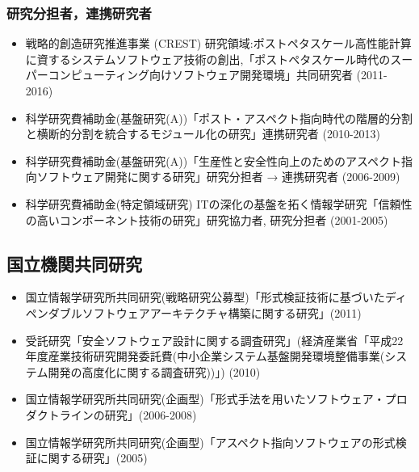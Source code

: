 \documentclass{jarticle}
\begin{document}
\subsubsection{研究分担者，連携研究者}

\begin{itemize}
\item 戦略的創造研究推進事業 (CREST) 研究領域:ポストペタスケール高性能計算に資するシステムソフトウェア技術の創出,「ポストペタスケール時代のスーパーコンピューティング向けソフトウェア開発環境」共同研究者 (2011-2016)

\item 科学研究費補助金(基盤研究(A))「ポスト・アスペクト指向時代の階層的分割と横断的分割を統合するモジュール化の研究」連携研究者 (2010-2013)

\item 科学研究費補助金(基盤研究(A))「生産性と安全性向上のためのアスペクト指向ソフトウェア開発に関する研究」研究分担者 → 連携研究者 (2006-2009)

\item 科学研究費補助金(特定領域研究) ITの深化の基盤を拓く情報学研究「信頼性の高いコンポーネント技術の研究」研究協力者, 研究分担者 (2001-2005)
\end{itemize}


\subsection{国立機関共同研究}

\begin{itemize}
\item 国立情報学研究所共同研究(戦略研究公募型)「形式検証技術に基づいたディペンダブルソフトウェアアーキテクチャ構築に関する研究」(2011)

\item 受託研究「安全ソフトウェア設計に関する調査研究」(経済産業省「平成22年度産業技術研究開発委託費(中小企業システム基盤開発環境整備事業(システム開発の高度化に関する調査研究))」) (2010)

\item 国立情報学研究所共同研究(企画型)「形式手法を用いたソフトウェア・プロダクトラインの研究」(2006-2008)

\item 国立情報学研究所共同研究(企画型)「アスペクト指向ソフトウェアの形式検証に関する研究」(2005)
\end{itemize}


\end{document}
